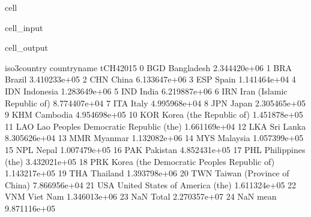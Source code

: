 \documentclass[letterpaper,10pt,english]{jupyterBook}
\begin{document}
\begin{sphinxuseclass}{cell}\begin{sphinxVerbatimInput}

\begin{sphinxuseclass}{cell_input}
\begin{sphinxVerbatim}[commandchars=\\\{\}]
\end{sphinxVerbatim}

\end{sphinxuseclass}\end{sphinxVerbatimInput}
\begin{sphinxVerbatimOutput}

\begin{sphinxuseclass}{cell_output}
\begin{sphinxVerbatim}[commandchars=\\\{\}]
   iso3\PYGZus{}country                                 country\PYGZus{}name     tCH4\PYGZus{}2015  \PYGZbs{}
0           BGD                                   Bangladesh  2.344420e+06   
1           BRA                                       Brazil  3.410233e+05   
2           CHN                                        China  6.133647e+06   
3           ESP                                        Spain  1.141464e+04   
4           IDN                                    Indonesia  1.283649e+06   
5           IND                                        India  6.219887e+06   
6           IRN                   Iran (Islamic Republic of)  8.774407e+04   
7           ITA                                        Italy  4.995968e+04   
8           JPN                                        Japan  2.305465e+05   
9           KHM                                     Cambodia  4.954698e+05   
10          KOR                      Korea (the Republic of)  1.451878e+05   
11          LAO       Lao People\PYGZsq{}s Democratic Republic (the)  1.661169e+04   
12          LKA                                    Sri Lanka  8.305626e+04   
13          MMR                                      Myanmar  1.132082e+06   
14          MYS                                     Malaysia  1.057399e+05   
15          NPL                                        Nepal  1.007479e+05   
16          PAK                                     Pakistan  4.852431e+05   
17          PHL                            Philippines (the)  3.432021e+05   
18          PRK  Korea (the Democratic People\PYGZsq{}s Republic of)  1.143217e+05   
19          THA                                     Thailand  1.393798e+06   
20          TWN                   Taiwan (Province of China)  7.866956e+04   
21          USA               United States of America (the)  1.611324e+05   
22          VNM                                     Viet Nam  1.346013e+06   
23          NaN                                        Total  2.270357e+07   
24          NaN                                         mean  9.871116e+05   


\end{sphinxVerbatim}
\end{sphinxuseclass}
\end{sphinxVerbatimOutput}
\end{sphinxuseclass}
\end{document}

